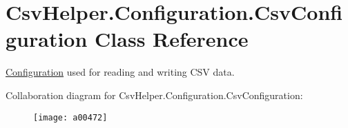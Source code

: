 \hypertarget{a00057}{\section{Csv\-Helper.\-Configuration.\-Csv\-Configuration Class Reference}
\label{a00057}
}


\hyperlink{a00326}{Configuration} used for reading and writing C\-S\-V data.  




Collaboration diagram for Csv\-Helper.\-Configuration.\-Csv\-Configuration\-:
\nopagebreak
\begin{figure}[H]
\begin{center}
\leavevmode
\texttt{[image: a00472]}
\end{center}
\end{figure}

